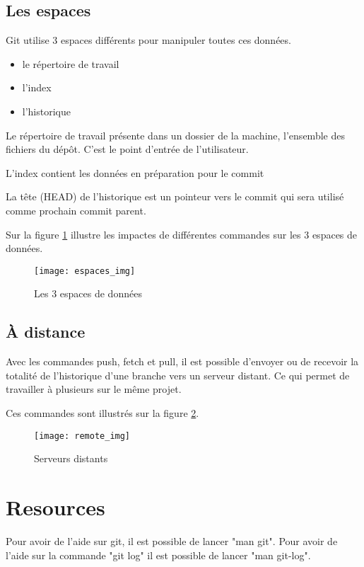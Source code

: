 \documentclass[a4paper]{article}
\begin{document}
\subsection*{Les espaces}
Git utilise 3 espaces différents pour manipuler toutes ces données.
\begin{itemize}
\item le répertoire de travail
\item l'index
\item l'historique
\end{itemize}

Le répertoire de travail présente dans un dossier de la machine, l'ensemble des fichiers du dépôt. C'est le point d'entrée de l'utilisateur.

L'index contient les données en préparation pour le commit

La tête (HEAD) de l'historique est un pointeur vers le commit qui sera utilisé comme prochain commit parent.

Sur la figure \ref{espaces} illustre les impactes de différentes commandes sur les 3 espaces de données.

\begin{figure}[ht]
  \centering
  \texttt{[image: espaces\_img]}
  \caption{Les 3 espaces de données}
  \label{espaces}
\end{figure}

\subsection*{À distance}
Avec les commandes push, fetch et pull, il est possible d'envoyer ou de recevoir la totalité de l'historique d'une branche vers un serveur distant. Ce qui permet de travailler à plusieurs sur le même projet.

Ces commandes sont illustrés sur la figure \ref{remote}.

\vspace{2mm}

\begin{figure}[ht]
  \center
  \texttt{[image: remote\_img]}
  \caption{Serveurs distants}
  \label{remote}
\end{figure}

\section*{Resources}
Pour avoir de l'aide sur git, il est possible de lancer "man git". Pour
avoir de l'aide sur la commande "git log" il est possible de lancer "man
git-log".
\end{document}
